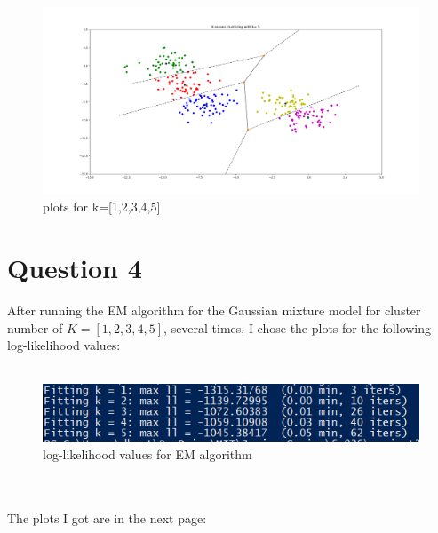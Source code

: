 \documentclass[letterpaper, 12pt]{article}
\begin{document}
\begin{figure}[h]
    \includegraphics[scale=0.15]{11k5}
    \caption {plots for k=[1,2,3,4,5]}
\end{figure}
\pagebreak

\section*{Question 4}
\vspace{3mm}
After running the EM algorithm for the Gaussian mixture model for cluster number of $K=[1,2,3,4,5]$, several times, I chose the plots for the following log-likelihood values: \\
\\
\begin{figure}[h]
    \centering  
    \includegraphics[scale=1.2]{14EMLL}
    \caption{log-likelihood values for EM algorithm}
\end{figure}
\\
\\


The plots I got are in the next page:
\end{document}
